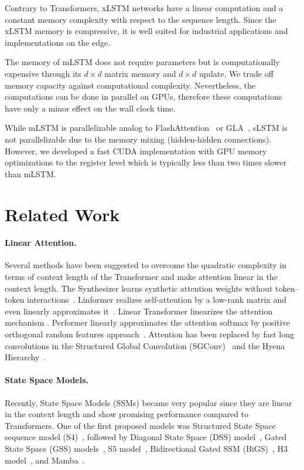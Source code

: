 Contrary to Transformers, xLSTM networks have a linear computation and a constant memory complexity with respect to the sequence length. Since the xLSTM memory is compressive, it is well suited for industrial applications and implementations on the edge.

The memory of mLSTM does not require parameters but is computationally expensive through its $d \times d$ matrix memory and $d \times d$ update. We trade off memory capacity against computational complexity. Nevertheless, the computations can be done in parallel on GPUs, therefore these computations have only a minor effect on the wall clock time.

While mLSTM is parallelizable analog to FlashAttention~\citep{Dao:22,Dao:23} or GLA~\citep{Yang:23arxiv}, sLSTM is not parallelizable due to the memory mixing (hidden-hidden connections). However, we developed a fast CUDA implementation with GPU memory optimizations to the register level which is typically less than two times slower than mLSTM.

\section{Related Work}
\label{sec:related}

\paragraph{Linear Attention.} Several methods have been suggested to overcome the quadratic complexity in terms of context length of the Transformer and make attention linear in the context length. The Synthesizer learns synthetic attention weights without token--token interactions~\citep{Tay:20arxiv}. Linformer realizes self-attention by a low-rank matrix and even linearly approximates it~\citep{Wang:20arxiv}. Linear Transformer linearizes the attention mechanism \citep{Katharopoulos:20}. Performer linearly approximates the attention softmax by positive orthogonal random features approach~\citep{Choromanski:21}. Attention has been replaced by fast long convolutions in the Structured Global Convolution (SGConv)~\citep{Li:22} and the Hyena Hierarchy~\citep{Poli:23}.

\paragraph{State Space Models.} Recently, State Space Models (SSMs) became very popular since they are linear in the context length and show promising performance compared to Transformers. One of the first proposed models was Structured State Space sequence model (S4)~\citep{Gu:21}, followed by Diagonal State Space (DSS) model~\citep{Gupta:22}, Gated State Space (GSS) models~\citep{Mehta:22}, S5 model~\citep{Smith:22}, Bidirectional Gated SSM (BiGS)~\citep{Wang:22}, H3 model~\citep{Fu:23}, and Mamba~\citep{Gu:24arxiv}.

